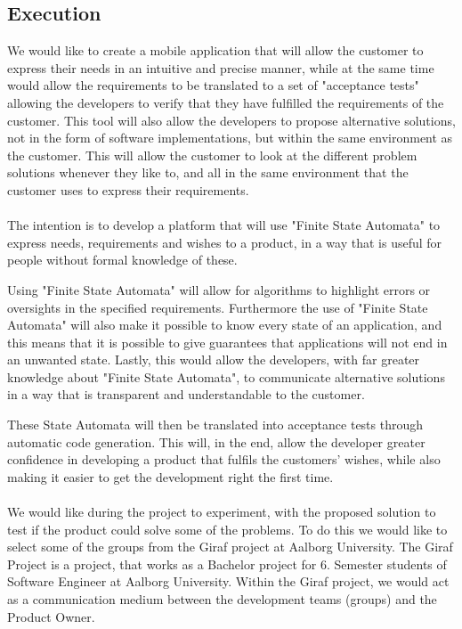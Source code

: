 \subsection{Execution}
We would like to create a mobile application that will allow the customer to express their needs in an intuitive and precise manner, while at the same time would allow the requirements to be translated to a set of "acceptance tests" allowing the developers to verify that they have fulfilled the requirements of the customer.
This tool will also allow the developers to propose alternative solutions, not in the form of software implementations, but within the same environment as the customer. 
This will allow the customer to look at the different problem solutions whenever they like to, and all in the same environment that the customer uses to express their requirements. 
\\\\
The intention is to develop a platform that will use "Finite State Automata" to express needs, requirements and wishes to a product, in a way that is useful for people without formal knowledge of these. 

Using "Finite State Automata" will allow for algorithms to highlight errors or oversights in the specified requirements.
Furthermore the use of "Finite State Automata" will also make it possible to know every state of an application, and this means that it is possible to give guarantees that applications will not end in an unwanted state. 
Lastly, this would allow the developers, with far greater knowledge about "Finite State Automata", to communicate alternative solutions in a way that is transparent and understandable to the customer. 

These State Automata will then be translated into acceptance tests through automatic code generation.
This will, in the end, allow the developer greater confidence in developing a product that fulfils the customers' wishes, while also making it easier to get the development right the first time.
\\\\
We would like during the project to experiment, with the proposed solution to test if the product could solve some of the problems.
To do this we would like to select some of the groups from the Giraf project at Aalborg University.
The Giraf Project is a project, that works as a Bachelor project for 6. Semester students of Software Engineer at Aalborg University. 
Within the Giraf project, we would act as a communication medium between the development teams (groups) and the Product Owner.

